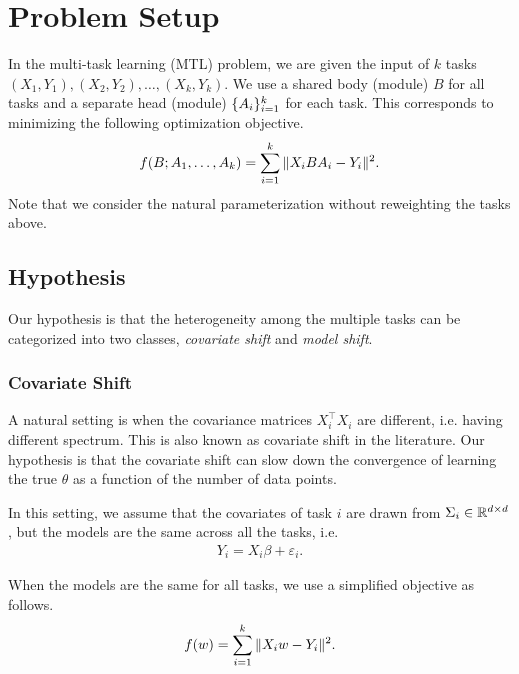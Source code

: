 \section{Problem Setup}\label{sec_setup}

In the multi-task learning (MTL) problem, we are given the input of $k$ tasks $(X_1, Y_1), (X_2, Y_2), \dots, (X_k, Y_k)$.
We use a shared body (module) $B$ for all tasks and a separate head (module) $\{A_i\}_{i=1}^k$ for each task.
This corresponds to minimizing the following optimization objective.
\begin{align}
	\label{eq_mtl}
	f(B; A_1, \dots, A_k) = \sum_{i=1}^k \|X_i B A_i - Y_i\|^2.
\end{align}
Note that we consider the natural parameterization without reweighting the tasks above.


\subsection{Hypothesis}

Our hypothesis is that the heterogeneity among the multiple tasks can be categorized into two classes, \textit{covariate shift} and \textit{model shift}. %

\subsubsection{Covariate Shift}

A natural setting is when the covariance matrices $X_i^{\top} X_i$ are different, i.e. having different spectrum.
This is also known as covariate shift in the literature.
Our hypothesis is that the covariate shift can slow down the convergence of learning the true $\theta$ as a function of the number of data points.


In this setting, we assume that the covariates of task $i$ are drawn from $\Sigma_i \in \mathbb{R}^{d \times d}$, but the models are the same across all the tasks, i.e.
\begin{align}
	Y_i = X_i \beta + \varepsilon_i. %
\end{align}

When the models are the same for all tasks, we use a simplified objective as follows.
\begin{align}
	\label{eq_mtl_basic}
	f(w) = \sum_{i=1}^k \|X_i w - Y_i\|^2.
\end{align}

